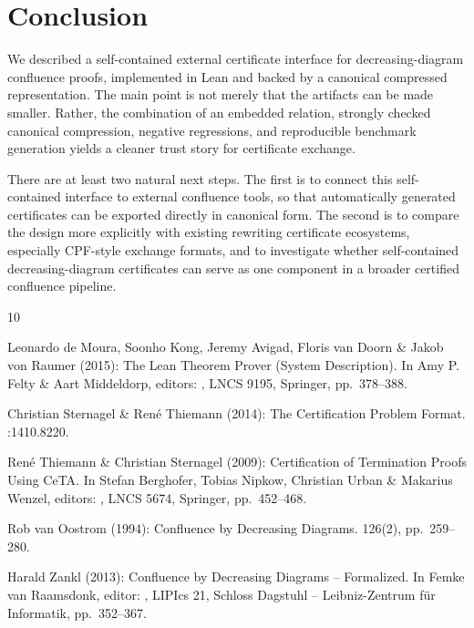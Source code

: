 \documentclass[submission,copyright,creativecommons]{eptcs}
\newcommand{\lean}{Lean\xspace}
\begin{document}
\section{Conclusion}

We described a self-contained external certificate interface for
decreasing-diagram confluence proofs, implemented in \lean and backed by a
canonical compressed representation. The main point is not merely that the
artifacts can be made smaller. Rather, the combination of an embedded relation,
strongly checked canonical compression, negative regressions, and reproducible
benchmark generation yields a cleaner trust story for certificate exchange.

There are at least two natural next steps. The first is to connect this
self-contained interface to external confluence tools, so that automatically
generated certificates can be exported directly in canonical form. The second is
to compare the design more explicitly with existing rewriting certificate
ecosystems, especially CPF-style exchange formats, and to investigate whether
self-contained decreasing-diagram certificates can serve as one component in a
broader certified confluence pipeline.

\begin{thebibliography}{10}

Leonardo de Moura, Soonho Kong, Jeremy Avigad, Floris van Doorn \& Jakob von
Raumer (2015):
\newblock The Lean Theorem Prover (System Description).
\newblock In Amy P. Felty \& Aart Middeldorp, editors:
,
\newblock LNCS 9195, Springer, pp.\ 378--388.

Christian Sternagel \& Ren{\'e} Thiemann (2014):
\newblock The Certification Problem Format.
:1410.8220.

Ren{\'e} Thiemann \& Christian Sternagel (2009):
\newblock Certification of Termination Proofs Using CeTA.
\newblock In Stefan Berghofer, Tobias Nipkow, Christian Urban \& Makarius
Wenzel, editors:
,
\newblock LNCS 5674, Springer, pp.\ 452--468.

Rob van Oostrom (1994):
\newblock Confluence by Decreasing Diagrams.
 126(2), pp.\ 259--280.

Harald Zankl (2013):
\newblock Confluence by Decreasing Diagrams -- Formalized.
\newblock In Femke van Raamsdonk, editor:
,
\newblock LIPIcs 21, Schloss Dagstuhl -- Leibniz-Zentrum f{\"u}r Informatik,
pp.\ 352--367.

\end{thebibliography}
\end{document}
